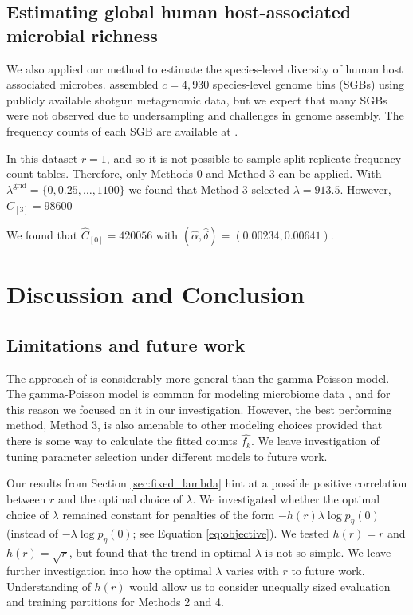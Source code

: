 \documentclass[12pt]{article}
\newcommand{\lambdagrid}{\lambda^{\text{grid}}}
\theoremstyle{break}
\theoremstyle{break}
\begin{document}


\subsection{Estimating global human host-associated microbial richness}

We also applied our method to estimate the species-level diversity of human host associated microbes.
\cite{pasolli2019extensive} assembled $c=4,930$ species-level genome bins (SGBs) using publicly available shotgun metagenomic data, but we expect that many SGBs were not observed due to undersampling and challenges in genome assembly. The frequency counts of each SGB are available at \cite[Table S4]{pasolli2019extensive}.

In this dataset $r=1$, and so it is not possible to sample split replicate frequency count tables. Therefore, only Methods 0 and Method 3 can be applied. With $\lambdagrid = \{0, 0.25, \ldots, 1100\}$ we found that Method 3 selected $\lambda = 913.5$. However, $\widehat{C}_{[3]} = 98600$

We found that $\widehat{C}_{[0]} = 420056$ with $(\hat{\alpha}, \hat{\delta}) = (0.00234, 0.00641).$


\section{Discussion and Conclusion}
\label{sec:discussion}

\subsection{Limitations and future work}

The approach of \citet{wang_2005} is considerably more general than the gamma-Poisson model.  The gamma-Poisson model is common for modeling microbiome data \citep{deseq2,mcmurdie2013phyloseq}, and for this reason we focused on it in our investigation. However, the best performing method, Method 3, is also amenable to other modeling choices provided that there is some way to calculate the fitted counts $\widehat{f_k}$. We leave investigation of tuning parameter selection under different models to future work.

Our results from Section \ref{sec:fixed_lambda} hint at a possible positive correlation between $r$ and the optimal choice of $\lambda$. We investigated whether the optimal choice of $\lambda$ remained constant for penalties of the form $-h(r)\lambda \log p_{\eta}(0)$ (instead of $-\lambda \log p_{\eta}(0)$; see Equation \eqref{eq:objective}).
We tested $h(r) = r$ and $h(r) = \sqrt{r}$, but found that the trend in optimal $\lambda$ is not so simple. We leave further investigation into how the optimal $\lambda$ varies with $r$ to future work. Understanding of $h(r)$ would allow us to consider unequally sized evaluation and training partitions for Methods 2 and 4.
\end{document}
